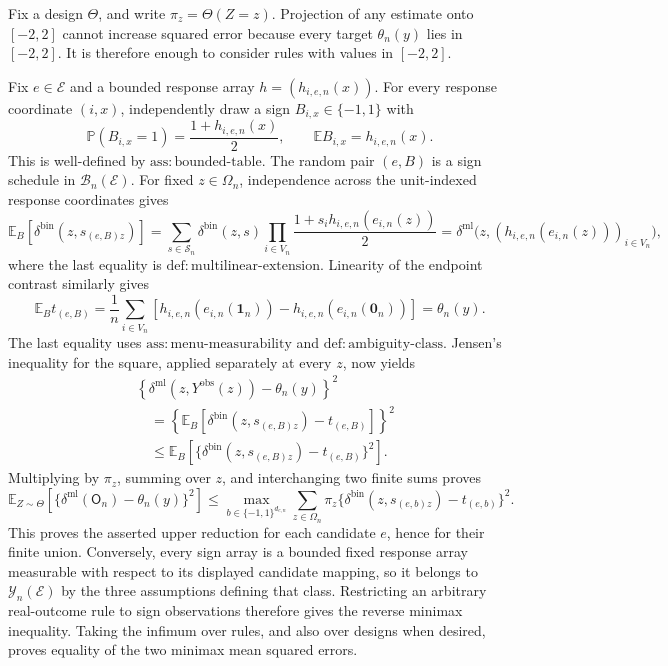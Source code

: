 Fix a design \(\Theta\), and write \(\pi_z=\Theta(Z=z)\).  Projection of any estimate onto \([-2,2]\) cannot increase squared error because every target \(\theta_n(y)\) lies in \([-2,2]\).  It is therefore enough to consider rules with values in \([-2,2]\).

Fix \(e\in\mathcal E\) and a bounded response array \(h=(h_{i,e,n}(x))\).  For every response coordinate \((i,x)\), independently draw a sign \(B_{i,x}\in\{-1,1\}\) with
\[
 \mathbb P(B_{i,x}=1)=\frac{1+h_{i,e,n}(x)}2,
 \qquad
 \mathbb E B_{i,x}=h_{i,e,n}(x).
\]
This is well-defined by \(\mathrm{ass{:}bounded\text{-}table}\).  The random pair \((e,B)\) is a sign schedule in \(\mathcal B_n(\mathcal E)\).  For fixed \(z\in\Omega_n\), independence across the unit-indexed response coordinates gives
\[
 \mathbb E_B\!\left[\delta^{\mathrm{bin}}(z,s_{(e,B)z})\right]
 =\sum_{s\in\mathcal S_n}\delta^{\mathrm{bin}}(z,s)
   \prod_{i\in V_n}\frac{1+s_i h_{i,e,n}(e_{i,n}(z))}{2}
 =\delta^{\mathrm{ml}}\bigl(z,(h_{i,e,n}(e_{i,n}(z)))_{i\in V_n}\bigr),
\]
where the last equality is \(\mathrm{def{:}multilinear\text{-}extension}\).  Linearity of the endpoint contrast similarly gives
\[
 \mathbb E_B t_{(e,B)}
 =\frac1n\sum_{i\in V_n}
   \left[h_{i,e,n}(e_{i,n}(\mathbf 1_n))-h_{i,e,n}(e_{i,n}(\mathbf 0_n))\right]
 =\theta_n(y).
\]
The last equality uses \(\mathrm{ass{:}menu\text{-}measurability}\) and \(\mathrm{def{:}ambiguity\text{-}class}\).  Jensen's inequality for the square, applied separately at every \(z\), now yields
\[
 \begin{aligned}
 &\left\{\delta^{\mathrm{ml}}(z,Y^{\mathrm{obs}}(z))-\theta_n(y)\right\}^2\\
 &\quad=\left\{\mathbb E_B[\delta^{\mathrm{bin}}(z,s_{(e,B)z})-t_{(e,B)}]\right\}^2\\
 &\quad\le \mathbb E_B\left[\{\delta^{\mathrm{bin}}(z,s_{(e,B)z})-t_{(e,B)}\}^2\right].
 \end{aligned}
\]
Multiplying by \(\pi_z\), summing over \(z\), and interchanging two finite sums proves
\[
 \mathbb E_{Z\sim\Theta}\!\left[
   \{\delta^{\mathrm{ml}}(\mathsf O_n)-\theta_n(y)\}^2\right]
 \le
 \max_{b\in\{-1,1\}^{d_{e,n}}}
 \sum_{z\in\Omega_n}\pi_z
   \{\delta^{\mathrm{bin}}(z,s_{(e,b)z})-t_{(e,b)}\}^2.
\]
This proves the asserted upper reduction for each candidate \(e\), hence for their finite union.  Conversely, every sign array is a bounded fixed response array measurable with respect to its displayed candidate mapping, so it belongs to \(\mathcal Y_n(\mathcal E)\) by the three assumptions defining that class.  Restricting an arbitrary real-outcome rule to sign observations therefore gives the reverse minimax inequality.  Taking the infimum over rules, and also over designs when desired, proves equality of the two minimax mean squared errors.